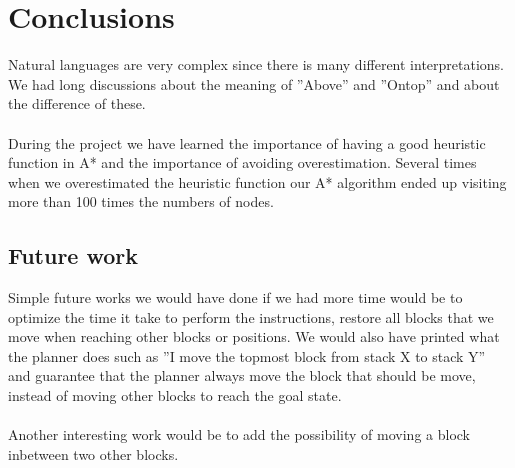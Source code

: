 \chapter{Conclusions}
Natural languages are very complex since there is many different 	
interpretations. We had long discussions about the meaning of ''Above'' and ''Ontop'' and about the difference of these.  
\\\\
During the project we have learned the importance of having a good heuristic function in A* and the importance of avoiding overestimation. 
Several times when we overestimated the heuristic function our A* algorithm ended up visiting more than 100 times the numbers of nodes. 
 
\section{Future work}
Simple future works we would have done if we had more time would be to optimize the time it take to perform the instructions, restore all blocks that we move when reaching other blocks or positions. We would also have printed what the planner does such as ''I move the topmost block from stack X to stack Y'' and guarantee that the planner always move the block that should be move, instead of moving other blocks to reach the goal state.
\\\\
Another interesting work would be to add the possibility of moving a block inbetween two other blocks. 
